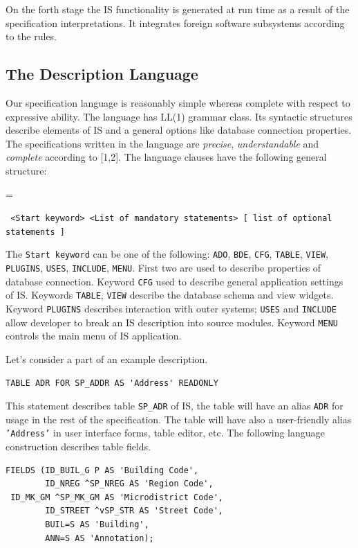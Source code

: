 \documentclass[conference]{IEEEtran}
\newcommand{\e}[2][fcolor]{\textcolor{pcolor}{[}\textcolor{#1}{#2}\textcolor{pcolor}{]}}
\newenvironment{asdcode}{\hangindent=\parindent\hangafter=1\par\noindent\small\tt}{}
\begin{document}
On the forth stage the IS functionality is generated at run time as a result of the specification interpretations.  It integrates foreign software subsystems according to the rules. %

\subsection{The Description Language}

Our specification language is reasonably simple whereas complete with respect to expressive ability.  The language has LL(1) grammar class.  Its syntactic structures describe elements of IS and a general options like database connection properties.  The specifications written in the language are \emph{precise}, \emph{understandable} and \emph{complete} according to [1,2].  The language clauses have the following general structure:

\begin{asdcode}%
<Start keyword> <List of mandatory statements> [~list of optional statements~]
\end{asdcode}

The \texttt{Start keyword} can be one of the following: \texttt{ADO}, \texttt{BDE}, \texttt{CFG}, \texttt{TABLE}, \texttt{VIEW}, \texttt{PLUGINS}, \texttt{USES}, \texttt{INCLUDE}, \texttt{MENU}.  First two are used to describe properties of database connection.  Keyword \texttt{CFG} used to describe general application settings of IS.  Keywords \texttt{TABLE}, \texttt{VIEW} describe the database schema and view widgets.  Keyword \texttt{PLUGINS} describes interaction with outer systems; \texttt{USES} and \texttt{INCLUDE} allow developer to break an IS description into source modules.  Keyword \texttt{MENU} controls the main menu of IS application.

Let's consider a part of an example description.

\begin{lstlisting}
TABLE ADR FOR SP_ADDR AS 'Address' READONLY
\end{lstlisting}

This statement describes table \texttt{SP\_ADR} of IS, the table will have an alias \texttt{ADR} for usage in the rest of the specification.  The table will have also a user-friendly alias \texttt{'Address'} in user interface forms, table editor, etc.  The following language construction describes table fields.

\begin{lstlisting}
FIELDS (ID_BUIL_G P AS 'Building Code',
        ID_NREG ^SP_NREG AS 'Region Code',
 ID_MK_GM ^SP_MK_GM AS 'Microdistrict Code',
        ID_STREET ^vSP_STR AS 'Street Code',
        BUIL=S AS 'Building',
        ANN=S AS 'Annotation);
\end{lstlisting}%
\end{document}
